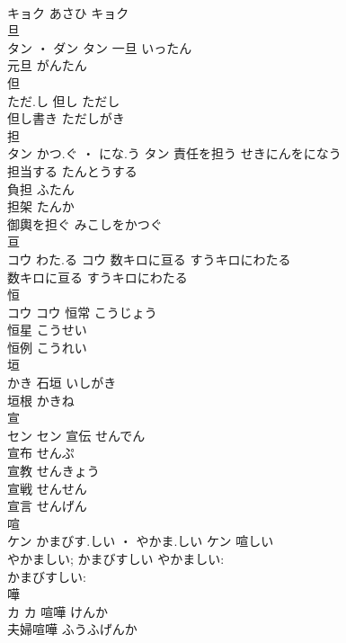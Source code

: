 \documentclass[8pt]{extreport}
\begin{document}
\begin{CJK}{UTF8}{min}
\\	キョク	あさひ	キョク																																			
\\	旦	
\\	タン ・ ダン		タン	一旦	いったん	
\\	元旦	がんたん	
\\	但	
\\	ただ.し		但し	ただし	
\\	但し書き	ただしがき	
\\	担	
\\	タン	かつ.ぐ ・ にな.う	タン	責任を担う	せきにんをになう	
\\	担当する	たんとうする	
\\	負担	ふたん	
\\	担架	たんか	
\\	御輿を担ぐ	みこしをかつぐ	
\\	亘	
\\	コウ	わた.る	コウ	数キロに亘る	すうキロにわたる	
\\	数キロに亘る	すうキロにわたる	
\\	恒	
\\	コウ		コウ	恒常	こうじょう	
\\	恒星	こうせい	
\\	恒例	こうれい	
\\	垣	
\\	かき		石垣	いしがき	
\\	垣根	かきね	
\\	宣	
\\	セン		セン	宣伝	せんでん	
\\	宣布	せんぷ	
\\	宣教	せんきょう	
\\	宣戦	せんせん	
\\	宣言	せんげん	
\\	喧	
\\	ケン	かまびす.しい ・ やかま.しい	ケン	喧しい 
\\	やかましい; かまびすしい	やかましい: 
\\	かまびすしい: 
\\	嘩	
\\	カ		カ	喧嘩	けんか	
\\	夫婦喧嘩	ふうふげんか	
\end{CJK}
\end{document}
